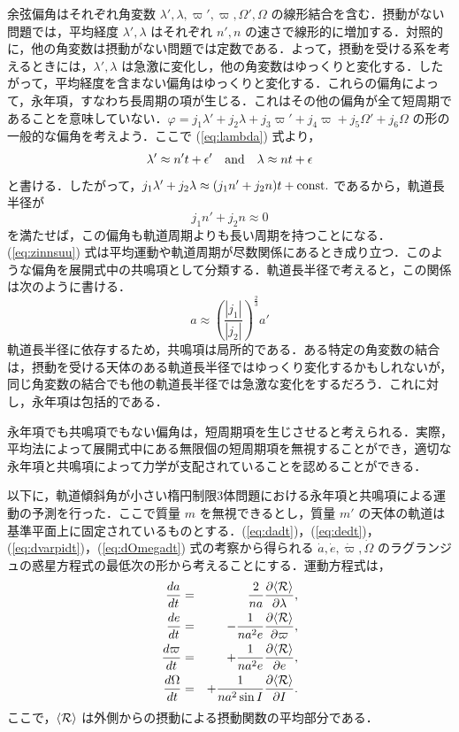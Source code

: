 \documentclass[11pt,a4paper,oneside,onecolumn]{jreport}
\begin{document}
余弦偏角はそれぞれ角変数 $\lambda', \lambda, \varpi', \varpi, \Omega', \Omega$ の線形結合を含む．摂動がない問題では，平均経度 $\lambda', \lambda$ はそれぞれ $n', n$ の速さで線形的に増加する．対照的に，他の角変数は摂動がない問題では定数である．よって，摂動を受ける系を考えるときには，$\lambda', \lambda$ は急激に変化し，他の角変数はゆっくりと変化する．したがって，平均経度を含まない偏角はゆっくりと変化する．これらの偏角によって，永年項，すなわち長周期の項が生じる．これはその他の偏角が全て短周期であることを意味していない．$\varphi = j_1 \lambda' + j_2 \lambda + j_3 \varpi' + j_4 \varpi + j_5 \Omega' + j_6 \Omega$ の形の一般的な偏角を考えよう．ここで (\ref{eq:lambda}) 式より，
\begin{equation}
\lambda' \approx n' t + \epsilon' \quad {\rm and} \quad \lambda \approx n t + \epsilon
\end{equation}
と書ける．したがって，$j_1 \lambda' + j_2 \lambda \approx (j_1 n' + j_2 n) t + {\rm const.}$ であるから，軌道長半径が
\begin{equation}
j_1 n' + j_2 n \approx 0 \label{eq:zinnsuu}
\end{equation}
を満たせば，この偏角も軌道周期よりも長い周期を持つことになる．(\ref{eq:zinnsuu}) 式は平均運動や軌道周期が尽数関係にあるとき成り立つ．このような偏角を展開式中の共鳴項として分類する．軌道長半径で考えると，この関係は次のように書ける．
\begin{equation}
a \approx \left( \frac{|j_1|}{|j_2|} \right)^{\frac{2}{3}} a'
\end{equation}
軌道長半径に依存するため，共鳴項は局所的である．ある特定の角変数の結合は，摂動を受ける天体のある軌道長半径ではゆっくり変化するかもしれないが，同じ角変数の結合でも他の軌道長半径では急激な変化をするだろう．これに対し，永年項は包括的である．

永年項でも共鳴項でもない偏角は，短周期項を生じさせると考えられる．実際，平均法によって展開式中にある無限個の短周期項を無視することができ，適切な永年項と共鳴項によって力学が支配されていることを認めることができる．

以下に，軌道傾斜角が小さい楕円制限3体問題における永年項と共鳴項による運動の予測を行った．ここで質量 $m$ を無視できるとし，質量 $m'$ の天体の軌道は基準平面上に固定されているものとする．(\ref{eq:dadt})，(\ref{eq:dedt})，(\ref{eq:dvarpidt})，(\ref{eq:dOmegadt}) 式の考察から得られる $\dot{a}, \dot{e}, \dot{\varpi}, \dot{\Omega}$ のラグランジュの惑星方程式の最低次の形から考えることにする．運動方程式は，
\begin{eqnarray}
\frac{d a}{d t} & = & \frac{2}{n a} \frac{\partial \langle {\cal R} \rangle}{\partial \lambda}, \label{eq:dadt2} \\
\frac{d e}{d t} & = & - \frac{1}{n a^2 e} \frac{\partial \langle {\cal R} \rangle}{\partial \varpi}, \label{eq:dedt2} \\
\frac{d \varpi}{d t} & = & + \frac{1}{n a^2 e} \frac{\partial \langle {\cal R} \rangle}{\partial e}, \label{eq:dvarpidt2} \\
\frac{d \Omega}{d t} & = & + \frac{1}{n a^2 \sin I} \frac{\partial \langle {\cal R} \rangle}{\partial I}.\label{eq:dOmegadt2}
\end{eqnarray}
ここで，$\langle {\cal R} \rangle$ は外側からの摂動による摂動関数の平均部分である．
\end{document}
